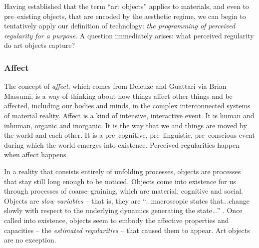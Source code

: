 \documentclass[letterpaper]{article}
\begin{document}
    Having established that the term “art objects” applies to materials, and even to pre–existing objects, that are encoded by the aesthetic regime, we can begin to tentatively apply our definition of technology: \emph{the programming of perceived regularity for a purpose}. A question immediately arises: what perceived regularity do art objects capture?

    \subsubsection{Affect}

    The concept of \emph{affect}, which comes from Deleuze and Guattari via Brian Massumi, is a way of thinking about how things affect other things and be affected, including our bodies and minds, in the complex interconnected systems of material reality. Affect is a kind of intensive, interactive event. It is human and inhuman, organic and inorganic. It is the way that we and things are moved by the world and each other. It is a pre–cognitive, pre–linguistic, pre–conscious event during which the world emerges into existence. Perceived regularities happen when affect happens.
    
    In a reality that consists entirely of unfolding processes, objects are processes that stay still long enough to be noticed. Objects come into existence for us through processes of coarse–graining, which are material, cognitive and social. Objects are \emph{slow variables} – that is, they are “...macroscopic states that...change slowly with respect to the underlying dynamics generating the state...” \citep[p.61]{FlackEtAlTmsclsSymmtryUncrtnty2013}. Once called into existence, objects seem to embody the affective properties and capacities – the \emph{estimated regularities} \citep[p.9]{FlackCrsGrnng2017} – that caused them to appear. Art objects are no exception.
\end{document}
